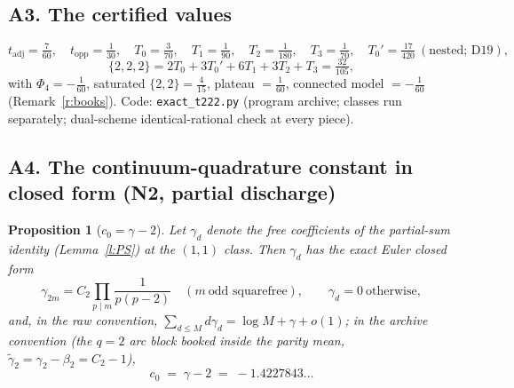 \documentclass[11pt]{article}
\numberwithin{equation}{section}
\newtheorem{proposition}[theorem]{Proposition}
\theoremstyle{definition}
\theoremstyle{remark}
\begin{document}
\subsection*{A3. The certified values}

\[
t_{\mathrm{adj}}=\tfrac7{60},\quad
t_{\mathrm{opp}}=\tfrac1{30},\quad
T_0=\tfrac3{70},\quad
T_1=\tfrac1{90},\quad
T_2=\tfrac1{180},\quad
T_3=\tfrac1{70},\quad
T_0'=\tfrac{17}{420}\ (\text{nested; D19}),
\]
\[
\{2,2,2\}=2T_0+3T_0'+6T_1+3T_2+T_3=\tfrac{32}{105},
\]
with $\Phi_4=-\tfrac1{60}$, saturated $\{2,2\}=\tfrac4{15}$,
plateau $=\tfrac1{60}$, connected model $=-\tfrac1{60}$
(Remark~\ref{r:books}). Code:
\texttt{exact\_t222.py} (program archive; classes run separately;
dual-scheme identical-rational check at every piece).

\subsection*{A4. The continuum-quadrature constant in closed form
(N2, partial discharge)}

\begin{proposition}[$c_0=\gamma-2$]\label{p:c0}
Let $\gamma_d$ denote the free coefficients of the partial-sum
identity (Lemma~\ref{l:PS}) at the $(1,1)$ class. Then
$\gamma_d$ has the exact Euler closed form
\[
\gamma_{2m}=C_2\prod_{p\mid m}\frac1{p(p-2)}
\quad(m\ \text{odd squarefree}),\qquad
\gamma_d=0\ \text{otherwise},
\]
and, in the raw convention,
$\sum_{d\le M}d\gamma_d=\log M+\gamma+o(1)$; in the archive
convention (the $q=2$ arc block booked inside the parity mean,
$\widetilde\gamma_2=\gamma_2-\beta_2=C_2-1$),
\[
c_0\;=\;\gamma-2\;=\;-1.4227843\ldots
\]
\end{proposition}
\end{document}
